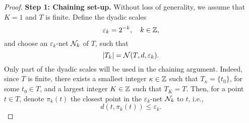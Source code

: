 \begin{proof}
    \textbf{Step 1: Chaining set-up.} Without loss of generality, we assume that \(K=1\) and \(T\) is finite. Define the dyadic scales
    \begin{equation*}
        \varepsilon_{k}=2^{-k},\quad k\in{\mathbb Z},
    \end{equation*}
    and choose an \(\varepsilon_{k}\)-net \({\mathcal N}_{k}\) of \(T\), such that
    \begin{equation*}
        |T_{k}|={\mathcal N}(T,d,\varepsilon_{k}).
    \end{equation*}
    Only part of the dyadic scales will be used in the chaining argument. Indeed, since \(T\) is finite, there exists a smallest integer \(\kappa\in{\mathbb Z}\) such that \(T_{\kappa}=\{t_{0}\}\), for some \(t_{0}\in T\), and a largest integer \(K\in{\mathbb Z}\) such that \(T_{K}=T\). Then, for a point \(t\in T\), denote \(\pi_{k}(t)\) the closest point in the \(\varepsilon_{k}\)-net \({\mathcal N}_{k}\) to \(t\), i.e.,
    \begin{equation*}
        d(t,\pi_{k}(t))\leq\varepsilon_{k}.
    \end{equation*}


\end{proof}
